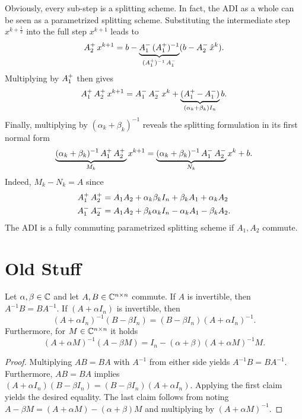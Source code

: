 Obviously, every sub-step is a splitting scheme.
In fact, the ADI as a whole can be seen as a parametrized splitting scheme.
Substituting the intermediate step $x^{k+\frac{1}{2}}$ into the full step $x^{k+1}$ leads to
\begin{equation*}
  \mathop{A_2^+} x^{k+1}
  = b - \underbrace{
    \mathop{A_1^-}\mathop{(\mathop{A_1^+})^{-1}}
  }_{\mathop{(\mathop{A_1^+})^{-1}}\mathop{A_1^-}}
  (b - \mathop{A_2^-} \hat x^k)
  .
\end{equation*}
Multiplying by $\mathop{A_1^+}$ then gives
\begin{equation*}
  \Aip\Aiip x^{k+1} = \Aim\Aiim x^k +
  \underbrace{%
  (\Aip - \Aim)
  }_{(\alpha_k + \beta_k) I_n}
  b
  .
\end{equation*}
Finally, multiplying by $(\alpha_k + \beta_k)^{-1}$ reveals the splitting formulation in its first normal form
\begin{equation}
\label{eq:adi:general1step}
  \underbrace{
    (\alpha_k + \beta_k)^{-1} \mathop{A_1^+}\mathop{A_2^+} \\
  }_{M_k}
  x^{k+1} =
  \underbrace{
    (\alpha_k + \beta_k)^{-1} \mathop{A_1^-}\mathop{A_2^-}
  }_{N_k}
  x^k + b
  .
\end{equation}
Indeed, $M_k - N_k = A$ since
\begin{align*}
  \mathop{A_1^+}\mathop{A_2^+} &= A_1A_2 + \alpha_k\beta_k I_n + \beta_k A_1 + \alpha_k A_2 \\
  \mathop{A_1^-}\mathop{A_2^-} &= A_1A_2 + \beta_k\alpha_k I_n - \alpha_k A_1 - \beta_k A_2
  .
\end{align*}
The ADI is a fully commuting parametrized splitting scheme if $A_1, A_2$ commute.

\section{Old Stuff}

\begin{lemma}
\label{thm:adi:commuting-matrices}
  Let $\alpha, \beta\in\mathbb{C}$ and let $A, B \in\mathbb{C}^{n\times n}$ commute.
  If $A$ is invertible, then $A^{-1}B = BA^{-1}$.
  If $(A+\alpha I_n)$ is invertible, then
  \begin{equation*}
    (A+\alpha I_n)^{-1} (B-\beta I_n)
    = (B-\beta I_n) (A+\alpha I_n)^{-1}
    .
  \end{equation*}
  Furthermore, for $M\in\mathbb{C}^{n\times n}$ it holds
  \begin{equation*}
    (A+\alpha M)^{-1} (A-\beta M)
    = I_n - (\alpha+\beta) (A+\alpha M)^{-1} M
    .
  \end{equation*}
\end{lemma}
\begin{proof}
  Multiplying $AB=BA$ with $A^{-1}$ from either side yields $A^{-1}B=BA^{-1}$.
  Furthermore, $AB=BA$ implies
  $
    (A+\alpha I_n) (B-\beta I_n)
    =
    (B-\beta I_n) (A+\alpha I_n)
  $.
  Applying the first claim yields the desired equality.
  The last claim follows from noting
  $A-\beta M = (A+\alpha M) - (\alpha+\beta)M$
  and multiplying by $(A+\alpha M)^{-1}$.
\end{proof}

